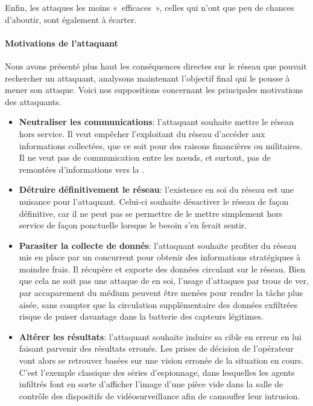 Enfin, les attaques les moins « efficaces », celles qui n'ont que peu de chances d'aboutir, sont également à écarter.

        \paragraph{Motivations de l'attaquant}
Nous avons présenté plus haut les conséquences directes sur le réseau que pouvait rechercher un attaquant, analysons maintenant l'objectif final qui le pousse à mener son attaque.
Voici nos suppositions concernant les principales motivations des attaquants.
\begin{itemize}
    \item \textbf{Neutraliser les communications}: l'attaquant souhaite mettre le réseau hors service. Il veut empêcher l'exploitant du réseau d'accéder aux informations collectées, que ce soit pour des raisons financières ou militaires. Il ne veut pas de communication entre les nœuds, et surtout, pas de remontées d'informations vers la \sdb.
    \item \textbf{Détruire définitivement le réseau}: l'existence en soi du réseau est une nuisance pour l'attaquant. Celui-ci souhaite désactiver le réseau de façon définitive, car il ne peut pas se permettre de le mettre simplement hors service de façon ponctuelle lorsque le besoin s'en ferait sentir.
    \item \textbf{Parasiter la collecte de donnés}: l'attaquant souhaite profiter du réseau mis en place par un concurrent pour obtenir des informations stratégiques à moindre frais. Il récupère et exporte des données circulant sur le réseau. Bien que cela ne soit pas une attaque de \dds en soi, l'usage d'attaques par trous de ver, par accaparement du médium peuvent être menées pour rendre la tâche plus aisée, sans compter que la circulation supplémentaire des données exfiltrées risque de puiser davantage dans la batterie des capteurs légitimes.
    \item \textbf{Altérer les résultats}: l'attaquant souhaite induire sa cible en erreur en lui faisant parvenir des résultats erronés. Les prises de décision de l'opérateur vont alors se retrouver basées sur une vision erronée de la situation en cours. C'est l'exemple classique des séries d'espionnage, dans lesquelles les agents infiltrés font en sorte d'afficher l'image d'une pièce vide dans la salle de contrôle des dispositifs de vidéosurveillance afin de camoufler leur intrusion.
\end{itemize}

